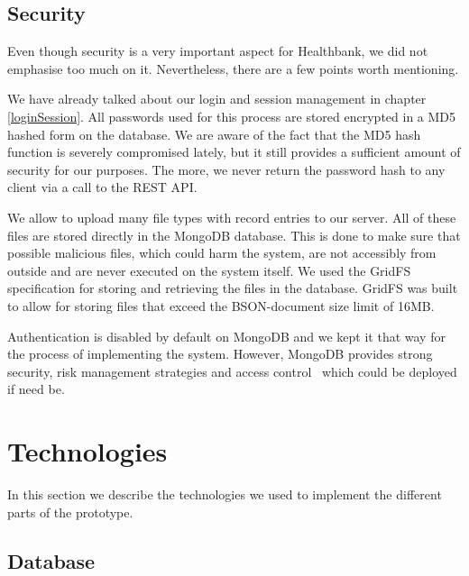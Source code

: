 \subsection{Security}

Even though security is a very important aspect for Healthbank, we did not emphasise too much on it. Nevertheless, there are a few points worth mentioning. 

We have already talked about our login and session management in chapter \ref{loginSession}. All passwords used for this process are stored encrypted in a MD5 hashed form on the database. We are aware of the fact that the MD5 hash function is severely compromised lately, but it still provides a sufficient amount of security for our purposes. The more, we never return the password hash to any client via a call to the REST API. 

We allow to upload many file types with record entries to our server. All of these files are stored directly in the MongoDB database. This is done to make sure that possible malicious files, which could harm the system, are not accessibly from outside and are never executed on the system itself. We used the GridFS specification for storing and retrieving the files in the database. GridFS was built to allow for storing files that exceed the BSON-document size limit of 16MB.

Authentication is disabled by default on MongoDB and we kept it that way for the process of implementing the system. However, MongoDB provides strong security, risk management strategies and access control~\cite{mongosecurity} which could be deployed if need be. 


\section{Technologies}

In this section we describe the technologies we used to implement the different parts of the prototype. 


\subsection{Database}

